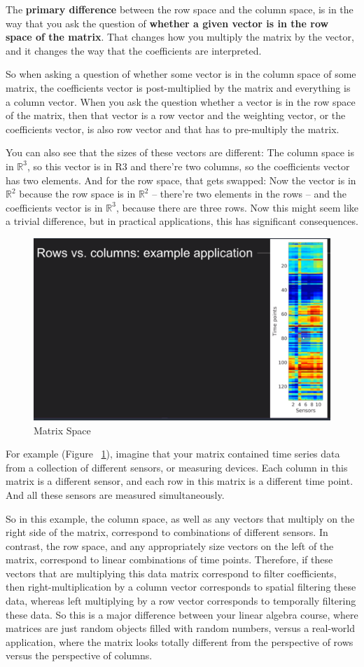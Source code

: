 \documentclass[fleqn,10pt]{olplainarticle}
\theoremstyle{definition}
\theoremstyle{remark}
\begin{document}
The \textbf{primary difference} between the row space and the column space, is in the way that you ask the question of \textbf{whether a given vector is in the row space of the matrix}. That changes how you multiply the matrix by the vector, and it changes the way that the coefficients are interpreted.

So when asking a question of whether some vector is in the column space of some matrix, the coefficients vector is post-multiplied by the matrix and everything is a column vector. When you ask the question whether a vector is in the row space of the matrix, then that vector is a row vector and the weighting vector, or the coefficients vector, is also row vector and that has to pre-multiply the matrix.

You can also see that the sizes of these vectors are different: The column space is in $\mathbb{R}^3$, so this vector is in R3 and there're two columns, so the coefficients vector has two elements. And for the row space, that gets swapped: Now the vector is in $\mathbb{R}^2$ because the row space is in $\mathbb{R}^2$ -- there're two elements in the rows -- and the coefficients vector is in $\mathbb{R}^3$, because there are three rows. Now this might seem like a trivial difference, but in practical applications, this has significant consequences.

\begin{figure}[ht]
	\centering
	\includegraphics[width=0.5\linewidth]{images/matrix-space-15.png}
	\caption{Matrix Space}
	\label{fig:matrix_space_15}
\end{figure}

For example (Figure ~\ref{fig:matrix_space_15}), imagine that your matrix contained time series data from a collection of different sensors, or measuring devices. Each column in this matrix is a different sensor, and each row in this matrix is a different time point. And all these sensors are measured simultaneously. 

So in this example, the column space, as well as any vectors that multiply on the right side of the matrix, correspond to combinations of different sensors. In contrast, the row space, and any appropriately size vectors on the left of the matrix, correspond to linear combinations of time points. Therefore, if these vectors that are multiplying this data matrix correspond to filter coefficients, then right-multiplication by a column vector corresponds to spatial filtering these data, whereas left multiplying by a row vector corresponds to temporally filtering these data. So this is a major difference between your linear algebra course, where matrices are just random objects filled with random numbers, versus a real-world application, where the matrix looks totally different from the perspective of rows versus the perspective of columns.
\end{document}

